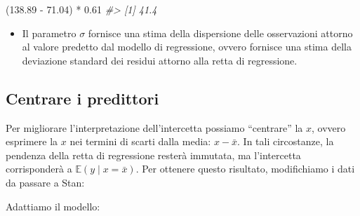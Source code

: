 \documentclass[
  10pt,
  italian,
  a4paper,
  extrafontsizes,onecolumn,openright
  ]{memoir}
\newenvironment{Shaded}{\begin{snugshade}}{\end{snugshade}}
\newcommand{\AttributeTok}[1]{\textcolor[rgb]{0.77,0.63,0.00}{#1}}
\newcommand{\CommentTok}[1]{\textcolor[rgb]{0.56,0.35,0.01}{\textit{#1}}}
\newcommand{\DecValTok}[1]{\textcolor[rgb]{0.00,0.00,0.81}{#1}}
\newcommand{\FloatTok}[1]{\textcolor[rgb]{0.00,0.00,0.81}{#1}}
\newcommand{\FunctionTok}[1]{\textcolor[rgb]{0.00,0.00,0.00}{#1}}
\newcommand{\NormalTok}[1]{#1}
\newcommand{\OtherTok}[1]{\textcolor[rgb]{0.56,0.35,0.01}{#1}}
\newcommand{\SpecialCharTok}[1]{\textcolor[rgb]{0.00,0.00,0.00}{#1}}
\providecommand{\tightlist}{%
  \setlength{\itemsep}{0pt}\setlength{\parskip}{0pt}}
\newcommand{\E}{\mathbb{E}} %
\begin{document}
\begin{Shaded}
\begin{Highlighting}[]
\NormalTok{(}\FloatTok{138.89} \SpecialCharTok{{-}} \FloatTok{71.04}\NormalTok{) }\SpecialCharTok{*} \FloatTok{0.61}
\CommentTok{\#\textgreater{} [1] 41.4}
\end{Highlighting}
\end{Shaded}

\begin{itemize}
\tightlist
\item
  Il parametro \(\sigma\) fornisce una stima della dispersione delle osservazioni attorno al valore predetto dal modello di regressione, ovvero fornisce una stima della deviazione standard dei residui attorno alla retta di regressione.
\end{itemize}

\hypertarget{centrare-i-predittori}{%
\subsection{Centrare i predittori}\label{centrare-i-predittori}}

Per migliorare l'interpretazione dell'intercetta possiamo ``centrare'' la \(x\), ovvero esprimere la \(x\) nei termini di scarti dalla media: \(x - \bar{x}\). In tali circostanze, la pendenza della retta di regressione resterà immutata, ma l'intercetta corrisponderà a \(\E(y \mid x = \bar{x})\). Per ottenere questo risultato, modifichiamo i dati da passare a Stan:

\begin{Shaded}
\end{Shaded}

\noindent
Adattiamo il modello:

\begin{Shaded}
\end{Shaded}
\end{document}
